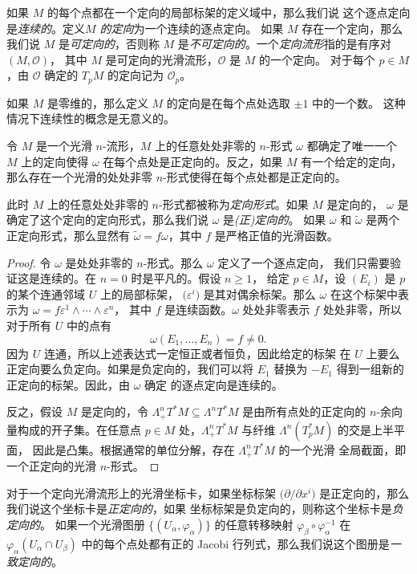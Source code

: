 如果 $M$ 的每个点都在一个定向的局部标架的定义域中，那么我们说
这个逐点定向是\emph{连续的}。定义\emph{$M$ 的定向}为一个连续的逐点定向。
如果 $M$ 存在一个定向，那么我们说 $M$ 是\emph{可定向的}，否则称
$M$ 是\emph{不可定向的}。一个\emph{定向流形}指的是有序对 $(M,\mathcal{O})$，
其中 $M$ 是可定向的光滑流形，$\mathcal{O}$ 是 $M$ 的一个定向。
对于每个 $p\in M$，由 $\mathcal{O}$ 确定的 $T_pM$ 的定向记为 $\mathcal{O}_p$。

如果 $M$ 是零维的，那么定义 $M$ 的定向是在每个点处选取 $\pm 1$ 中的一个数。
这种情况下连续性的概念是无意义的。

\begin{proposition}[由 $n$-形式确定的定向]
  令 $M$ 是一个光滑 $n$-流形，$M$ 上的任意处处非零的 $n$-形式 $\omega$ 都确定了唯一一个
  $M$ 上的定向使得 $\omega$ 在每个点处是正定向的。反之，如果 $M$
  有一个给定的定向，那么存在一个光滑的处处非零 $n$-形式使得在每个点处都是正定向的。
\end{proposition}
\begin{remark}
  此时 $M$ 上的任意处处非零的 $n$-形式都被称为\emph{定向形式}。如果 $M$ 是定向的，
  $\omega$ 是确定了这个定向的定向形式，那么我们说 $\omega$ 是\emph{(正)定向的}。
  如果 $\omega$ 和 $\tilde\omega$ 是两个正定向形式，那么显然有 
  $\tilde\omega=f\omega$，其中 $f$ 是严格正值的光滑函数。
\end{remark}
\begin{proof}
  令 $\omega$ 是处处非零的 $n$-形式。那么 $\omega$ 定义了一个逐点定向，
  我们只需要验证这是连续的。在 $n=0$ 时是平凡的。假设 $n\ge 1$，
  给定 $p\in M$，设 $(E_i)$ 是 $p$ 的某个连通邻域 $U$ 上的局部标架，
  $\bigl(\varepsilon^i\bigr)$ 是其对偶余标架。那么 $\omega$
  在这个标架中表示为 $\omega=f\varepsilon^1\wedge\cdots\wedge\varepsilon^n$，
  其中 $f$ 是连续函数。$\omega$ 处处非零表示 $f$ 处处非零，所以
  对于所有 $U$ 中的点有
  \[
    \omega(E_1,\dots,E_n)=f\neq 0.
  \]
  因为 $U$ 连通，所以上述表达式一定恒正或者恒负，因此给定的标架
  在 $U$ 上要么正定向要么负定向。如果是负定向的，我们可以将 $E_1$
  替换为 $-E_1$ 得到一组新的正定向的标架。因此，由 $\omega$ 确定
  的逐点定向是连续的。

  反之，假设 $M$ 是定向的，令 $\Lambda_+^nT^*M\subseteq \Lambda^nT^*M$
  是由所有点处的正定向的 $n$-余向量构成的开子集。在任意点 $p\in M$
  处，$\Lambda_+^nT^*M$ 与纤维 $\Lambda^n(T_p^*M)$ 的交是上半平面，
  因此是凸集。根据通常的单位分解，存在 $\Lambda_+^nT^*M$ 的一个光滑
  全局截面，即一个正定向的光滑 $n$-形式。
\end{proof}

对于一个定向光滑流形上的光滑坐标卡，如果坐标标架 $\bigl(\partial/\partial x^i\bigr)$
是正定向的，那么我们说这个坐标卡是\emph{正定向的}，如果
坐标标架是负定向的，则称这个坐标卡是\emph{负定向的}。
如果一个光滑图册 $\{(U_\alpha,\varphi_\alpha)\}$ 的任意转移映射
$\varphi_\beta\circ\varphi_\alpha^{-1}$ 在 $\varphi_\alpha(U_\alpha\cap U_\beta)$
中的每个点处都有正的 Jacobi 行列式，那么我们说这个图册是\emph{一致定向的}。

